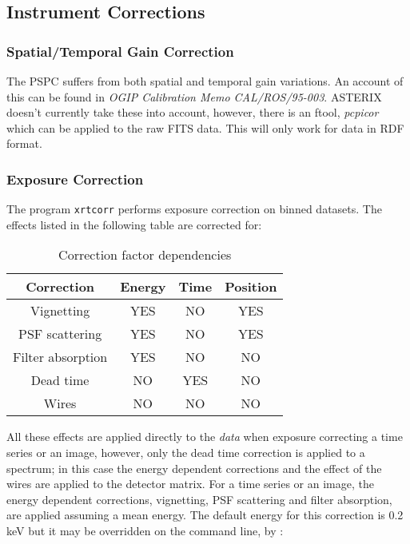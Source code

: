 \documentclass[11pt,fleqn]{article}    %
\begin{document}
\subsection{Instrument Corrections}
\subsubsection{Spatial/Temporal Gain Correction}
The PSPC suffers from both spatial and temporal gain variations.  An
account of this can be found in {\it OGIP Calibration Memo CAL/ROS/95-003}.
ASTERIX doesn't currently take these into account, however, there is an
ftool, {\it pcpicor} which can be applied to the raw FITS data.
This will only work for data in RDF format.
\subsubsection{Exposure Correction} 
The program {\tt xrtcorr} performs exposure correction on binned datasets. The 
effects listed in the following table are corrected for:

\begin {table}
\caption{Correction factor dependencies}
\label{t:corr}
\begin{center}
\begin{tabular}{|c|c|c|c|}
\hline
  Correction    &  Energy   & Time  &  Position \\ \hline
Vignetting      &   YES     &  NO   &    YES    \\
PSF scattering  &   YES     &  NO   &    YES    \\
Filter absorption &   YES     &  NO   &    NO   \\
Dead time       &   NO      &  YES  &    NO     \\
Wires           &   NO      &  NO   &    NO    \\
\hline
\end{tabular}
\end{center}

\end{table}

All these effects are applied directly to the {\em data} when exposure
correcting a time series or an image, however, only the dead time correction
is applied to a spectrum; in this case the energy dependent corrections 
and the effect of the wires are applied to the detector matrix. 
For a time series or an image, the energy dependent 
corrections, vignetting,
PSF scattering and filter absorption, are applied assuming a mean energy.
The default energy for this correction is 0.2 keV but it may be overridden
on the command line, by :
\end{document}
